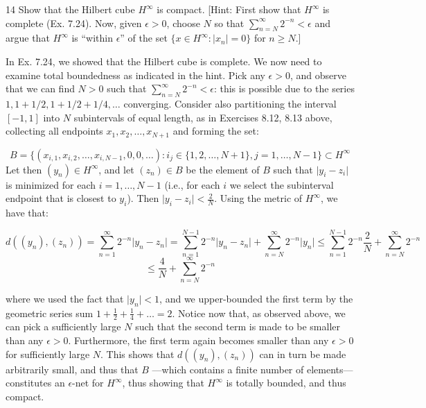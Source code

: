 \begin{exercise}{14}
    Show that the Hilbert cube $H^{\infty}$ is compact.
    [Hint: First show that $H^{\infty}$ is complete (Ex. 7.24).
    Now, given $\epsilon > 0$, choose $N$ so that $\sum_{n=N}^{\infty} 2^{-n} < \epsilon$ and argue that $H^{\infty}$ is ``within $\epsilon$'' of the set $\{x \in H^{\infty}: \lvert x_n \rvert = 0\}$ for $n \geq N$.]
\end{exercise}

\begin{solution}
    
    In Ex. 7.24, we showed that the Hilbert cube is complete.
    We now need to examine total boundedness as indicated in the hint.
    Pick any $\epsilon > 0$, and observe that we can find $N > 0$ such that $\sum_{n=N}^{\infty} 2^{-n} < \epsilon$: this is possible due to the series $1, 1 + 1/2, 1 + 1/2 + 1/4, \ldots$ converging.
    Consider also partitioning the interval $[-1, 1]$ into $N$ subintervals of equal length, as in Exercises 8.12, 8.13 above, collecting all endpoints $x_1, x_2, \ldots, x_{N+1}$ and forming the set:

    \[B = \{(x_{i, 1}, x_{i, 2}, \ldots, x_{i, N - 1}, 0, 0, \ldots): i_j \in \{1, 2, \ldots, N + 1\}, j = 1, \ldots, N - 1\} \subset H^{\infty}\]
    Let then $(y_n) \in H^{\infty}$, and let $(z_n) \in B$ be the element of $B$ such that $\lvert y_{i} - z_i \rvert$ is minimized for each $i = 1, \ldots, N - 1$ (i.e., for each $i$ we select the subinterval endpoint that is closest to $y_i$).
    Then $\lvert y_i - z_i \rvert < \frac{2}{N}$.
    Using the metric of $H^{\infty}$, we have that:

    \[d((y_n), (z_n)) = \sum_{n=1}^{\infty}2^{-n} \lvert y_n - z_n \rvert = \sum_{n = 1}^{N - 1} 2^{-n} \lvert y_n - z_n \rvert + \sum_{n = N}^{\infty} 2^{-n} \lvert y_n \rvert \leq \sum_{n=1}^{N-1}2^{-n}\frac{2}{N} + \sum_{n=N}^{\infty} 2^{-n}\]
    \[\leq \frac{4}{N} + \sum_{n=N}^{\infty} 2^{-n}\]

    where we used the fact that $\lvert y_n \rvert < 1$, and we upper-bounded the first term by the geometric series sum $1 + \frac{1}{2} + \frac{1}{4} + \ldots = 2$.
    Notice now that, as observed above, we can pick a sufficiently large $N$ such that the second term is made to be smaller than any $\epsilon > 0$.
    Furthermore, the first term again becomes smaller than any $\epsilon > 0$ for sufficiently large $N$.
    This shows that $d((y_n), (z_n))$ can in turn be made arbitrarily small, and thus that $B$ ---which contains a finite number of elements--- constitutes an $\epsilon$-net for $H^{\infty}$, thus showing that $H^{\infty}$ is totally bounded, and thus compact.
    
\end{solution}

